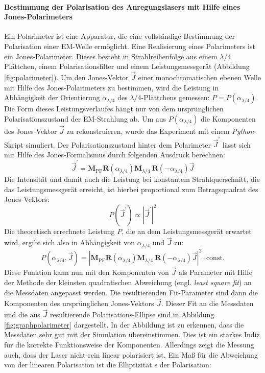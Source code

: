 \documentclass[titlepage,  ngerman]{article}
\begin{document}
	\paragraph{Bestimmung der Polarisation des Anregungslasers mit Hilfe eines Jones-Polarimeters}
	Ein Polarimeter ist eine Apparatur, die eine vollständige Bestimmung der Polarisation einer EM-Welle ermöglicht. Eine Realisierung eines Polarimeters ist ein Jones-Polarimeter. Dieses besteht in Strahlreihenfolge aus einem $\lambda / 4$ Plättchen, einem Polarisationsfilter und einem Leistungsmessgerät (Abbildung \ref{fig:polarimeter}). Um den Jones-Vektor $\vec{J}$ einer monochromatischen ebenen Welle mit Hilfe des Jones-Polarimeters zu bestimmen, wird die Leistung in Abhängigkeit der Orientierung $\alpha_{\lambda/4}$ des $\lambda / 4$-Plättchens gemessen: $P = P(\alpha_{\lambda/4})$. Die Form dieses Leistungsverlaufes hängt nur von dem ursprünglichen Polarisationszustand der EM-Strahlung ab. Um aus $P(\alpha_{\lambda/4})$ die Komponenten des Jones-Vektor $\vec{J}$ zu rekonstruieren, wurde das Experiment mit einem \textit{Python}-Skript simuliert. Der Polarisationszustand hinter dem Polarimeter $\vec{J}^\prime$ lässt sich mit Hilfe des Jones-Formalismus durch folgenden Ausdruck berechnen:
	\begin{equation}
		\vec{J}^\prime = \boldsymbol{M}_\mathrm{PF} \boldsymbol{R}(\alpha_{\lambda/4})\boldsymbol{M}_{\lambda / 4}\ \boldsymbol{R}(-\alpha_{\lambda/4})\vec{J}
	\end{equation}
	Die Intensität und damit auch die Leistung bei konstantem Strahlquerschnitt, die das Leistungsmessgerät erreicht, ist hierbei proportional zum Betragsquadrat des Jones-Vektors:
	\begin{equation}
		P(\vec{J}^\prime) \propto \left|\vec{J}^\prime\right|^2
	\end{equation}
	Die theoretisch errechnete Leistung $P$, die an dem Leistungsmessgerät erwartet wird, ergibt sich also in Abhängigkeit von $\alpha_{\lambda/4}$ und $\vec{J}$ zu:
	\begin{equation}
		P(\alpha_{\lambda/4}, \vec{J}) = \left|\boldsymbol{M}_\mathrm{PF} \boldsymbol{R}(\alpha_{\lambda/4})\boldsymbol{M}_{\lambda / 4}\ \boldsymbol{R}(-\alpha_{\lambda/4})\vec{J}\right|^2 \cdot \mathrm{const.}
		\label{eq:simulation_polarimeter}
	\end{equation}
	Diese Funktion kann nun mit den Komponenten von $\vec{J}$ als Parameter mit Hilfe der Methode der kleinsten quadratischen Abweichung (engl. \textit{least square fit}) an die Messdaten angepasst werden. Die resultierenden Fit-Parameter sind dann die Komponenten des ursprünglichen Jones-Vektors $\vec{J}$. Dieser Fit an die Messdaten und die aus $\vec{J}$ resultierende Polarisations-Ellipse sind in Abbildung \ref{fig:graphpolarimeter} dargestellt. In der Abbildung ist zu erkennen, dass die Messdaten sehr gut mit der Simulation übereinstimmen. Dies ist ein starkes Indiz für die korrekte Funktionsweise der Komponenten. Allerdings zeigt die Messung auch, dass der Laser nicht rein linear polarisiert ist. Ein Maß für die Abweichung von der linearen Polarisation ist die Elliptizität $\epsilon$ der Polarisation:
\end{document}
